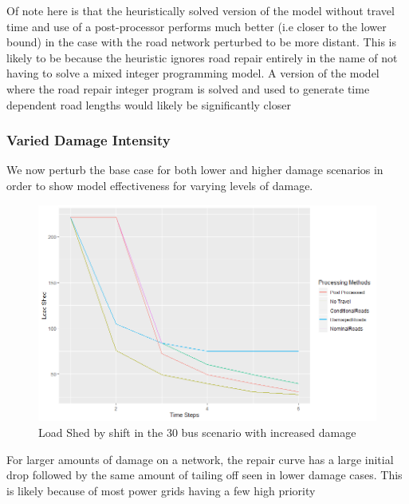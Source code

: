 \documentclass{article}
\begin{document}
	Of note here is that the heuristically solved version of the model without travel time and use of a post-processor performs much better (i.e closer to the lower bound) in the case with the road network perturbed to be more distant. This is likely to be because the heuristic ignores road repair entirely in the name of not having to solve a mixed integer programming model. A version of the model where the road repair integer program is solved and used to generate time dependent road lengths would likely be significantly closer
	
	\subsubsection{Varied Damage Intensity}
	We now perturb the base case for both lower and higher damage scenarios in order to show model effectiveness for varying levels of damage.
	\begin{figure}[H]
		\centering
		\includegraphics[width=.9\linewidth]{Rplot30scenario2.png}
		\caption{Load Shed by shift in the 30 bus scenario with increased damage}
		\label{fig:sub2}
		
		
	\end{figure}

	For larger amounts of damage on a network, the repair curve has a large initial drop followed by the same amount of tailing off seen in lower damage cases. This is likely because of most power grids having a few high priority 
\end{document}
